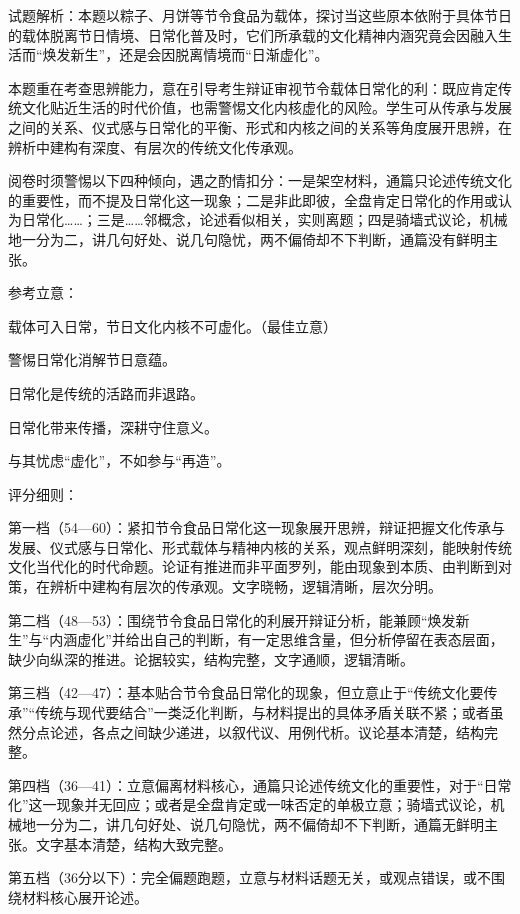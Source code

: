 \documentclass[11pt,a4paper]{ctexart}
\begin{document}


试题解析：本题以粽子、月饼等节令食品为载体，探讨当这些原本依附于具体节日的载体脱离节日情境、日常化普及时，它们所承载的文化精神内涵究竟会因融入生活而“焕发新生”，还是会因脱离情境而“日渐虚化”。

本题重在考查思辨能力，意在引导考生辩证审视节令载体日常化的利：既应肯定传统文化贴近生活的时代价值，也需警惕文化内核虚化的风险。学生可从传承与发展之间的关系、仪式感与日常化的平衡、形式和内核之间的关系等角度展开思辨，在辨析中建构有深度、有层次的传统文化传承观。

阅卷时须警惕以下四种倾向，遇之酌情扣分：一是架空材料，通篇只论述传统文化的重要性，而不提及日常化这一现象；二是非此即彼，全盘肯定日常化的作用或认为日常化……；三是……邻概念，论述看似相关，实则离题；四是骑墙式议论，机械地一分为二，讲几句好处、说几句隐忧，两不偏倚却不下判断，通篇没有鲜明主张。

参考立意：

载体可入日常，节日文化内核不可虚化。（最佳立意）

警惕日常化消解节日意蕴。

日常化是传统的活路而非退路。

日常化带来传播，深耕守住意义。

与其忧虑“虚化”，不如参与“再造”。

评分细则：

第一档（54—60）：紧扣节令食品日常化这一现象展开思辨，辩证把握文化传承与发展、仪式感与日常化、形式载体与精神内核的关系，观点鲜明深刻，能映射传统文化当代化的时代命题。论证有推进而非平面罗列，能由现象到本质、由判断到对策，在辨析中建构有层次的传承观。文字晓畅，逻辑清晰，层次分明。

第二档（48—53）：围绕节令食品日常化的利展开辩证分析，能兼顾“焕发新生”与“内涵虚化”并给出自己的判断，有一定思维含量，但分析停留在表态层面，缺少向纵深的推进。论据较实，结构完整，文字通顺，逻辑清晰。

第三档（42—47）：基本贴合节令食品日常化的现象，但立意止于“传统文化要传承”“传统与现代要结合”一类泛化判断，与材料提出的具体矛盾关联不紧；或者虽然分点论述，各点之间缺少递进，以叙代议、用例代析。议论基本清楚，结构完整。

第四档（36—41）：立意偏离材料核心，通篇只论述传统文化的重要性，对于“日常化”这一现象并无回应；或者是全盘肯定或一味否定的单极立意；骑墙式议论，机械地一分为二，讲几句好处、说几句隐忧，两不偏倚却不下判断，通篇无鲜明主张。文字基本清楚，结构大致完整。

第五档（36分以下）：完全偏题跑题，立意与材料话题无关，或观点错误，或不围绕材料核心展开论述。
\end{document}
